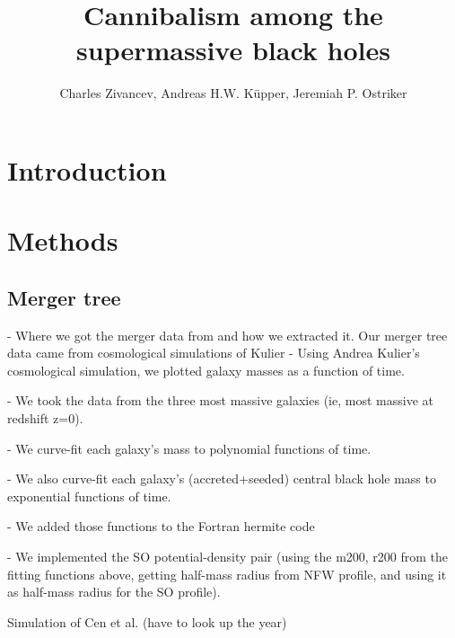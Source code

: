 \documentclass[english, apj]{emulateapj}
\begin{document}
\title{Cannibalism among the supermassive black holes}


\author{Charles Zivancev, Andreas H.W. K\"upper, Jeremiah P. Ostriker}




\begin{abstract}

\end{abstract}






\section{Introduction}\label{sec:introduction}



\section{Methods}\label{sec:methods}


\subsection{Merger tree}
- Where we got the merger data from and how we extracted it.
Our merger tree data came from cosmological simulations of Kulier
- Using Andrea Kulier's cosmological simulation, we plotted galaxy masses as a function of time.

- We took the data from the three most massive galaxies (ie, most massive at redshift z=0).

- We curve-fit each galaxy's mass to polynomial functions of time.

- We also curve-fit each galaxy's (accreted+seeded) central black hole mass to exponential functions of time.

- We added those functions to the Fortran hermite code

- We implemented the SO potential-density pair (using the m200, r200 from the fitting functions above, getting half-mass radius from NFW profile, and using it as half-mass radius for the SO profile).

Simulation of Cen et al. (have to look up the year)
\end{document}
